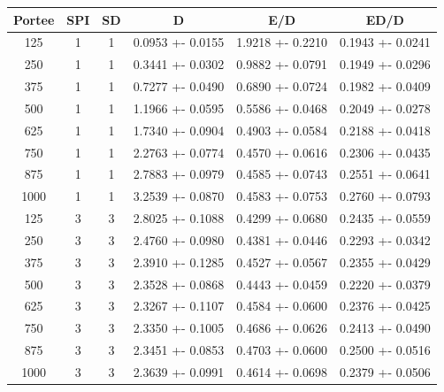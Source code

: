 \documentclass[a4paper]{article}
\begin{document}
\begin{center}
\begin{tabular}{|c|c|c|c|c|c|}
  \hline
Portee & SPI & SD & D & E/D & ED/D \\\hline
125 & 1 & 1 & 0.0953 +- 0.0155 & 1.9218 +- 0.2210 & 0.1943 +- 0.0241 \\\hline
250 & 1 & 1 & 0.3441 +- 0.0302 & 0.9882 +- 0.0791 & 0.1949 +- 0.0296 \\\hline
375 & 1 & 1 & 0.7277 +- 0.0490 & 0.6890 +- 0.0724 & 0.1982 +- 0.0409 \\\hline
500 & 1 & 1 & 1.1966 +- 0.0595 & 0.5586 +- 0.0468 & 0.2049 +- 0.0278 \\\hline
625 & 1 & 1 & 1.7340 +- 0.0904 & 0.4903 +- 0.0584 & 0.2188 +- 0.0418 \\\hline
750 & 1 & 1 & 2.2763 +- 0.0774 & 0.4570 +- 0.0616 & 0.2306 +- 0.0435 \\\hline
875 & 1 & 1 & 2.7883 +- 0.0979 & 0.4585 +- 0.0743 & 0.2551 +- 0.0641 \\\hline
1000 & 1 & 1 & 3.2539 +- 0.0870 & 0.4583 +- 0.0753 & 0.2760 +- 0.0793 \\\hline
125 & 3 & 3 & 2.8025 +- 0.1088 & 0.4299 +- 0.0680 & 0.2435 +- 0.0559 \\\hline
250 & 3 & 3 & 2.4760 +- 0.0980 & 0.4381 +- 0.0446 & 0.2293 +- 0.0342 \\\hline
375 & 3 & 3 & 2.3910 +- 0.1285 & 0.4527 +- 0.0567 & 0.2355 +- 0.0429 \\\hline
500 & 3 & 3 & 2.3528 +- 0.0868 & 0.4443 +- 0.0459 & 0.2220 +- 0.0379 \\\hline
625 & 3 & 3 & 2.3267 +- 0.1107 & 0.4584 +- 0.0600 & 0.2376 +- 0.0425 \\\hline
750 & 3 & 3 & 2.3350 +- 0.1005 & 0.4686 +- 0.0626 & 0.2413 +- 0.0490 \\\hline
875 & 3 & 3 & 2.3451 +- 0.0853 & 0.4703 +- 0.0600 & 0.2500 +- 0.0516 \\\hline
1000 & 3 & 3 & 2.3639 +- 0.0991 & 0.4614 +- 0.0698 & 0.2379 +- 0.0506 \\\hline
\end{tabular}
\end{center}
\end{document}
